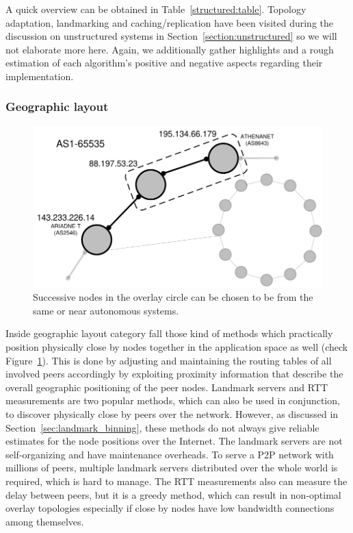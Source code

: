 A quick overview can be obtained in Table~\ref{structured:table}. Topology
adaptation, landmarking and caching/replication have been visited during the
discussion on unstructured systems in Section~\ref{section:unstructured} so
we will not elaborate more here. Again, we additionally gather highlights and a
rough estimation of each algorithm's positive and negative aspects regarding
their implementation.





\subsubsection{Geographic layout} \label{section:geographic_layout}

\begin{figure}[ht]
\centering
  \includegraphics[scale=0.4]{img/pdf/geographic-layout.pdf}
\caption{Successive nodes in the overlay circle can be chosen to be from the
same or near autonomous systems.}
\label{figure:geographic-layout}
\end{figure}

Inside geographic layout category fall those kind of methods which practically
position physically close by nodes together in the application space as well
(check Figure~\ref{figure:geographic-layout}). This is done by adjusting and
maintaining the routing tables of all involved peers accordingly by exploiting
proximity information that describe the overall geographic positioning of the
peer nodes. Landmark servers and RTT measurements are two popular methods, which
can also be used in conjunction, to discover physically close by peers over the
network. However, as discussed in Section~\ref{sec:landmark_binning}, these
methods do not always give reliable estimates for the node positions over the
Internet. The landmark servers are not self-organizing and have maintenance
overheads. To serve a P2P network with millions of peers, multiple landmark
servers distributed over the whole world is required, which is hard to manage.
The RTT measurements also can measure the delay between peers, but it is a
greedy method, which can result in non-optimal overlay topologies especially if
close by nodes have low bandwidth connections among themselves.

